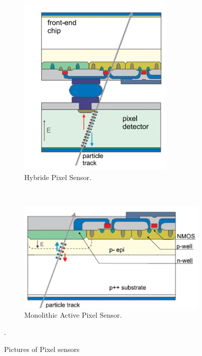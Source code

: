 \documentclass[12pt,a4paper]{article}
\begin{document}
\begin{figure}[hbt]
    \centering
    \begin{subfigure}[b]{0.4\textwidth}
        \includegraphics[width=\textwidth]{figure/HBS.png}
        \caption{Hybride Pixel Sensor.}
        \label{fig:HBS}
    \end{subfigure}
    \qquad
    ~ %
    \begin{subfigure}[b]{0.5\textwidth}
        \includegraphics[width=\textwidth]{figure/MAPS.png}
        \caption{Monolithic Active Pixel Sensor.}
        \label{fig:MAPS}
    \end{subfigure}
    \caption{Pictures of Pixel sensors\cite{Suljic:2303618}}.\label{fig:ITS}
\end{figure}
\end{document}
